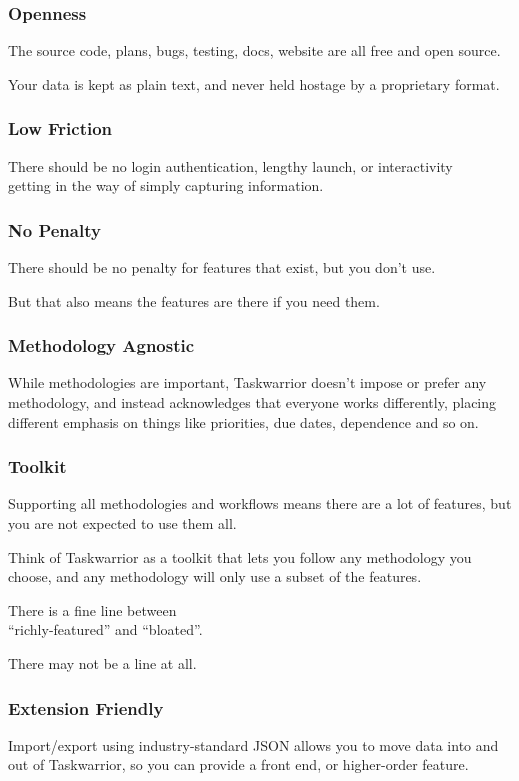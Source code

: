 \documentclass[t,handout,aspectratio=169]{beamer}
\begin{document}
\begin{frame}[fragile]\frametitle{Openness}
    \vfill
    The source code, plans, bugs, testing, docs, website are all free and open source. \pause

    Your data is kept as plain text, and never held hostage by a proprietary format.
\end{frame}

\begin{frame}[fragile]\frametitle{Low Friction}
    \vfill
    There should be no login authentication, lengthy launch, or interactivity \\
    getting in the way of simply capturing information.
\end{frame}

\begin{frame}[fragile]\frametitle{No Penalty}
    \vfill
    There should be no penalty for features that exist, but you don't use. \pause

    But that also means the features are there if you need them.
\end{frame}

\begin{frame}[fragile]\frametitle{Methodology Agnostic}
    \vfill
    While methodologies are important, Taskwarrior doesn't impose or prefer any methodology, and instead acknowledges that everyone works differently, placing different emphasis on things like priorities, due dates, dependence and so on.
\end{frame}

\begin{frame}[fragile]\frametitle{Toolkit}
    \vfill
    Supporting all methodologies and workflows means there are a lot of features, but you are not expected to use them all. \pause

    Think of Taskwarrior as a toolkit that lets you follow any methodology you choose, and any methodology will only use a subset of the features.
\end{frame}

\begin{frame}[standout]
    There is a fine line between \\
    ``richly-featured'' and ``bloated''.

    There may not be a line at all.
\end{frame}

\begin{frame}[fragile]\frametitle{Extension Friendly}
    \vfill
    Import/export using industry-standard JSON allows you to move data into and out of Taskwarrior, so you can provide a front end, or higher-order feature.
\end{frame}
\end{document}
